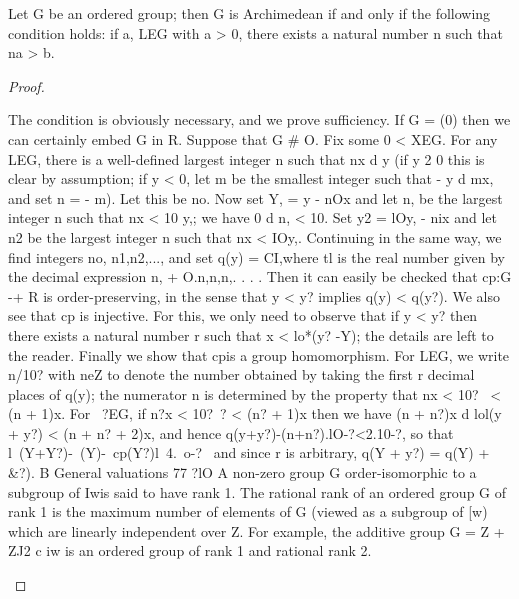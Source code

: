 \begin{theorem}[Theorem 10.6]\label{mcrt-auto-theorem-10-6}\uses{}
\begin{mathematicalrecord}
Let G be an ordered group; then G is Archimedean if and
only if the following condition holds:
    if a, LEG with a > 0, there exists a natural number n such that na > b.
\end{mathematicalrecord}
\end{theorem}
\begin{proof}
\begin{mathematicalrecord}
The condition is obviously necessary, and we prove sufficiency. If
G = (0) then we can certainly embed G in R. Suppose that G # {O}.
Fix some 0 < XEG. For any LEG, there is a well-defined largest integer
n such that nx d y (if y 2 0 this is clear by assumption; if y < 0, let m be
the smallest integer such that - y d mx, and set n = - m). Let this be no.
Now set Y, = y - nOx and let n, be the largest integer n such that nx < 10 y,;
we have 0 d n, < 10. Set y2 = lOy, - nix and let n2 be the largest integer
n such that nx < IOy,. Continuing in the same way, we find integers no,
n1,n2,..., and set q(y) = CI,where tl is the real number given by the decimal
expression n, + O.n,n,n,. . . . Then it can easily be checked that cp:G -+ R
is order-preserving, in the sense that y < y? implies q(y) < q(y?).
   We also see that cp is injective. For this, we only need to observe that
if y < y? then there exists a natural number r such that x < lo*(y? -Y);
the details are left to the reader.
   Finally we show that cpis a group homomorphism.         For LEG, we write
n/10? with neZ to denote the number obtained by taking the first r
decimal places of q(y); the numerator n is determined by the property that
nx < 10?~ < (n + 1)x. For ~?EG, if n?x < 10?~? < (n? + 1)x then we have
           (n + n?)x d lol(y + y?) < (n + n? + 2)x,
and hence
           q(y+y?)-(n+n?).lO-?<2.10-?,
so that
           l~(Y+Y?)-~(Y)-~cp(Y?)l~4.~o-?~
and since r is arbitrary, q(Y + y?) = q(Y) + &?).     B
General valuations                                                                      77
     ?lO
       A non-zero group G order-isomorphic to a subgroup of Iwis said to have
     rank 1. The rational rank of an ordered group G of rank 1 is the maximum
     number of elements of G (viewed as a subgroup of [w) which are linearly
     independent over Z. For example, the additive group G = Z + ZJ2 c iw is
     an ordered group of rank 1 and rational rank 2.
\end{mathematicalrecord}
\end{proof}


